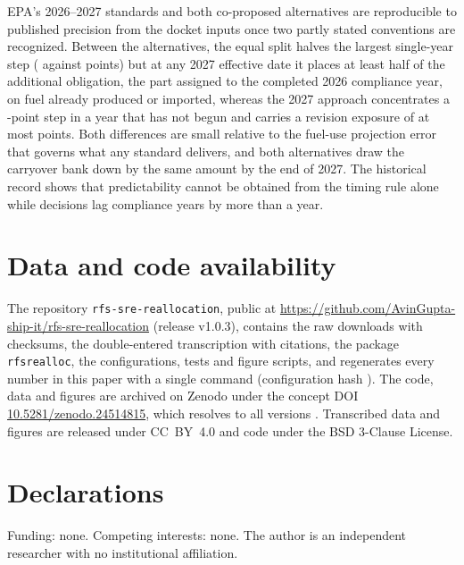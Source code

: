 \documentclass[preprint,12pt,authoryear]{elsarticle}
\newcommand{\releaseversion}{1.0.3}
\begin{document}
EPA's 2026--2027 standards and both co-proposed alternatives are reproducible to published precision from the docket inputs once two partly stated conventions are recognized. Between the alternatives, the equal split halves the largest single-year step (\valstepFirstEqual{} against \valstepSecondAllSecond{} points) but at any 2027 effective date it places at least half of the additional obligation, the part assigned to the completed 2026 compliance year, on fuel already produced or imported, whereas the 2027 approach concentrates a \valstepSecondAllSecond{}-point step in a year that has not begun and carries a revision exposure of at most \valrevisionMeanAbsSecondAllSecond{} points. Both differences are small relative to the fuel-use projection error that governs what any standard delivers, and both alternatives draw the carryover bank down by the same amount by the end of 2027. The historical record shows that predictability cannot be obtained from the timing rule alone while decisions lag compliance years by more than a year.

\section*{Data and code availability}
The repository \texttt{rfs-sre-reallocation}, public at \url{https://github.com/AvinGupta-ship-it/rfs-sre-reallocation} (release v\releaseversion), contains the raw downloads with checksums, the double-entered transcription with citations, the package \texttt{rfsrealloc}, the configurations, tests and figure scripts, and regenerates every number in this paper with a single command (configuration hash \valconfigHash). The code, data and figures are archived on Zenodo under the concept DOI \href{https://doi.org/10.5281/zenodo.24514815}{10.5281/zenodo.24514815}, which resolves to all versions \citep{gupta2026repository}. Transcribed data and figures are released under CC~BY~4.0 and code under the BSD 3-Clause License.

\section*{Declarations}
Funding: none. Competing interests: none. The author is an independent researcher with no institutional affiliation.



\end{document}
